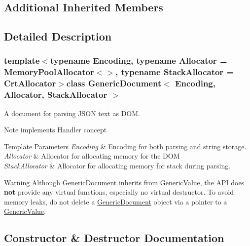 \subsection*{Additional Inherited Members}


\subsection{Detailed Description}
\subsubsection*{template$<$typename Encoding, typename Allocator = Memory\+Pool\+Allocator$<$$>$, typename Stack\+Allocator = Crt\+Allocator$>$class Generic\+Document$<$ Encoding, Allocator, Stack\+Allocator $>$}

A document for parsing J\+S\+O\+N text as D\+O\+M. 

\begin{DoxyNote}{Note}
implements Handler concept 
\end{DoxyNote}

\begin{DoxyTemplParams}{Template Parameters}
{\em Encoding} & Encoding for both parsing and string storage. \\
\hline
{\em Allocator} & Allocator for allocating memory for the D\+O\+M \\
\hline
{\em Stack\+Allocator} & Allocator for allocating memory for stack during parsing. \\
\hline
\end{DoxyTemplParams}
\begin{DoxyWarning}{Warning}
Although \hyperlink{class_generic_document}{Generic\+Document} inherits from \hyperlink{class_generic_value}{Generic\+Value}, the A\+P\+I does {\bfseries not} provide any virtual functions, especially no virtual destructor. To avoid memory leaks, do not {\ttfamily delete} a \hyperlink{class_generic_document}{Generic\+Document} object via a pointer to a \hyperlink{class_generic_value}{Generic\+Value}. 
\end{DoxyWarning}


\subsection{Constructor \& Destructor Documentation}
\hypertarget{class_generic_document_a6b1c313ad538cafc4d23d4bd5f97178c}{}
